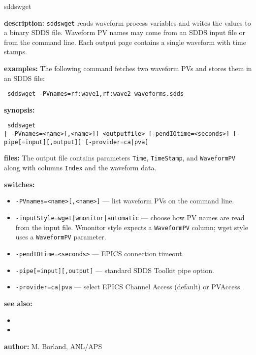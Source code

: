 \begin{sddsprog}{sddswget}
\item \textbf{description:}
  \verb+sddswget+ reads waveform process variables and writes the values to a binary SDDS file.  Waveform PV names may come from an SDDS input file or from the command line.  Each output page contains a single waveform with time stamps.

\item \textbf{examples:}
  The following command fetches two waveform PVs and stores them in an SDDS file:
  \begin{flushleft}{\tt
  sddswget -PVnames=rf:wave1,rf:wave2 waveforms.sdds
  }\end{flushleft}

\item \textbf{synopsis:}
  \begin{flushleft}{\tt
  sddswget\\\relax
      [<inputfile> [-inputStyle={wget|wmonitor|automatic}] | -PVnames=<name>[,<name>]]\
      <outputfile> [-pendIOtime=<seconds>] [-pipe[=input][,output]]\
      [-provider={ca|pva}]\
  }\end{flushleft}

\item \textbf{files:}
  The output file contains parameters \verb+Time+, \verb+TimeStamp+, and \verb+WaveformPV+ along with columns \verb+Index+ and the waveform data.

\item \textbf{switches:}
\begin{itemize}
  \item {\tt -PVnames=<name>[,<name>]} --- list waveform PVs on the command line.
  \item {\tt -inputStyle={wget|wmonitor|automatic}} --- choose how PV names are read from the input file.  Wmonitor style expects a \verb+WaveformPV+ column; wget style uses a \verb+WaveformPV+ parameter.
  \item {\tt -pendIOtime=<seconds>} --- EPICS connection timeout.
  \item {\tt -pipe[=input][,output]} --- standard SDDS Toolkit pipe option.
  \item {\tt -provider={ca|pva}} --- select EPICS Channel Access (default) or PVAccess.
\end{itemize}

\item \textbf{see also:}
\begin{itemize}
  \item {}
  \item {}
\end{itemize}

\item \textbf{author:} M. Borland, ANL/APS
\end{sddsprog}
